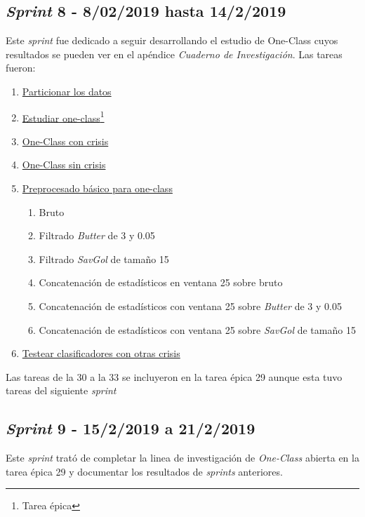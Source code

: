 \subsection{\textit{Sprint} 8 - 8/02/2019 hasta 14/2/2019}
Este \textit{sprint} fue dedicado a seguir desarrollando el estudio de One-Class cuyos resultados se pueden ver en el apéndice \textit{Cuaderno de Investigación}. Las tareas fueron:

\begin{enumerate}\addtocounter{enumi}{27}
	\item \href{https://github.com/joselucross/TFG-SmartBeds/issues/28}{Particionar los datos}
	\item \href{https://github.com/joselucross/TFG-SmartBeds/issues/29}{Estudiar one-class\footnote{Tarea épica}}
	\item \href{https://github.com/joselucross/TFG-SmartBeds/issues/30}{One-Class con crisis}
	\item \href{https://github.com/joselucross/TFG-SmartBeds/issues/31}{One-Class sin crisis}
	\item \href{https://github.com/joselucross/TFG-SmartBeds/issues/32}{Preprocesado básico para one-class}
	\begin{enumerate}
		\item Bruto
		\item Filtrado \textit{Butter} de 3 y 0.05
		\item Filtrado \textit{SavGol} de tamaño 15
		\item Concatenación de estadísticos en ventana 25 sobre bruto
		\item Concatenación de estadísticos con ventana 25 sobre \textit{Butter} de 3 y 0.05
		\item Concatenación de estadísticos con ventana 25 sobre \textit{SavGol} de tamaño 15
	\end{enumerate}
	\item \href{https://github.com/joselucross/TFG-SmartBeds/issues/33}{Testear clasificadores con otras crisis}
\end{enumerate}
Las tareas de la 30 a la 33 se incluyeron en la tarea épica 29 aunque esta tuvo tareas del siguiente \textit{sprint}

\subsection{\textit{Sprint} 9 - 15/2/2019 a 21/2/2019}
Este \textit{sprint} trató de completar la linea de investigación de \textit{One-Class} abierta en la tarea épica 29 y documentar los resultados de \textit{sprints} anteriores. 

